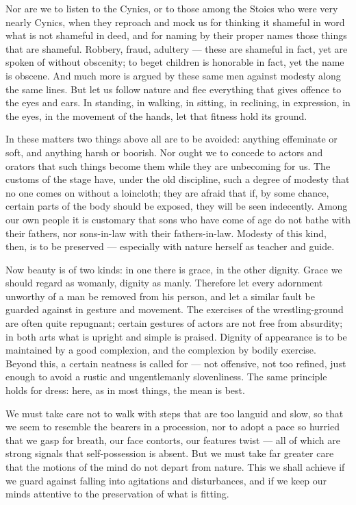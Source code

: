  Nor are we to listen to the Cynics, or to those among the Stoics who were very nearly Cynics, when they reproach and mock us for thinking it shameful in word what is not shameful in deed, and for naming by their proper names those things that are shameful. Robbery, fraud, adultery — these are shameful in fact, yet are spoken of without obscenity; to beget children is honorable in fact, yet the name is obscene. And much more is argued by these same men against modesty along the same lines. But let us follow nature and flee everything that gives offence to the eyes and ears. In standing, in walking, in sitting, in reclining, in expression, in the eyes, in the movement of the hands, let that fitness hold its ground.

 In these matters two things above all are to be avoided: anything effeminate or soft, and anything harsh or boorish. Nor ought we to concede to actors and orators that such things become them while they are unbecoming for us. The customs of the stage have, under the old discipline, such a degree of modesty that no one comes on without a loincloth; they are afraid that if, by some chance, certain parts of the body should be exposed, they will be seen indecently. Among our own people it is customary that sons who have come of age do not bathe with their fathers, nor sons-in-law with their fathers-in-law. Modesty of this kind, then, is to be preserved — especially with nature herself as teacher and guide.

 Now beauty is of two kinds: in one there is grace, in the other dignity. Grace we should regard as womanly, dignity as manly. Therefore let every adornment unworthy of a man be removed from his person, and let a similar fault be guarded against in gesture and movement. The exercises of the wrestling-ground are often quite repugnant; certain gestures of actors are not free from absurdity; in both arts what is upright and simple is praised. Dignity of appearance is to be maintained by a good complexion, and the complexion by bodily exercise. Beyond this, a certain neatness is called for — not offensive, not too refined, just enough to avoid a rustic and ungentlemanly slovenliness. The same principle holds for dress: here, as in most things, the mean is best.

 We must take care not to walk with steps that are too languid and slow, so that we seem to resemble the bearers in a procession, nor to adopt a pace so hurried that we gasp for breath, our face contorts, our features twist — all of which are strong signals that self-possession is absent. But we must take far greater care that the motions of the mind do not depart from nature. This we shall achieve if we guard against falling into agitations and disturbances, and if we keep our minds attentive to the preservation of what is fitting.

